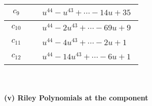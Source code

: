 \documentclass[1p]{elsarticle_modified}
\theoremstyle{definition}
\begin{document}
\begin{tabular}{m{50pt}|m{274pt}}
\hline $$\begin{aligned}c_{9}\end{aligned}$$&$\begin{aligned}
&u^{44}- u^{43}+\cdots-14 u+35
\end{aligned}$\\
\hline $$\begin{aligned}c_{10}\end{aligned}$$&$\begin{aligned}
&u^{44}-2 u^{43}+\cdots-69 u+9
\end{aligned}$\\
\hline $$\begin{aligned}c_{11}\end{aligned}$$&$\begin{aligned}
&u^{44}-4 u^{43}+\cdots-2 u+1
\end{aligned}$\\
\hline $$\begin{aligned}c_{12}\end{aligned}$$&$\begin{aligned}
&u^{44}-14 u^{43}+\cdots-6 u+1
\end{aligned}$\\
\hline
\end{tabular}\\~\\
\newpage\renewcommand{\arraystretch}{1}
\flushleft \textbf{(v) Riley Polynomials at the component}\newline \\
\end{document}
